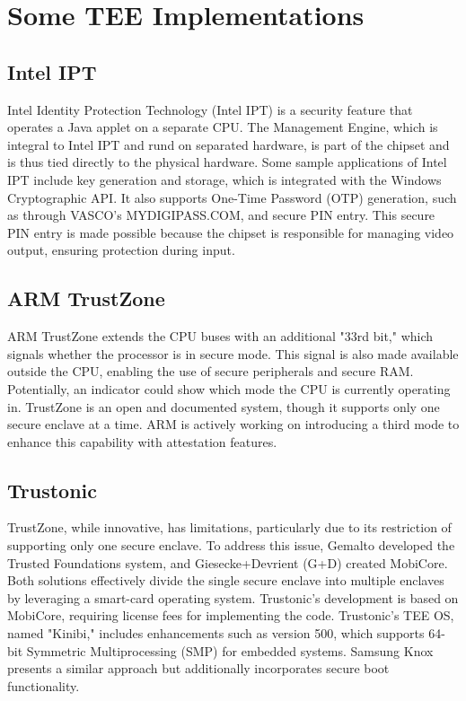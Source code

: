 \section{Some TEE Implementations}
\subsection{Intel IPT}

Intel Identity Protection Technology (Intel IPT) is a security feature
that operates a Java applet on a separate CPU. The Management Engine,
which is integral to Intel IPT and rund on separated hardware, is part
of the chipset and is thus tied directly to the physical hardware.
Some sample applications of Intel IPT include key generation and
storage, which is integrated with the Windows Cryptographic API. It
also supports One-Time Password (OTP) generation, such as through
VASCO's MYDIGIPASS.COM, and secure PIN entry. This secure PIN entry is
made possible because the chipset is responsible for managing video
output, ensuring protection during input.

\subsection{ARM TrustZone}

ARM TrustZone extends the CPU buses with an additional "33rd bit,"
which signals whether the processor is in secure mode. This signal is
also made available outside the CPU, enabling the use of secure
peripherals and secure RAM. Potentially, an indicator could show which
mode the CPU is currently operating in. TrustZone is an open and
documented system, though it supports only one secure enclave at a
time. ARM is actively working on introducing a third mode to enhance
this capability with attestation features.

\subsection{Trustonic}

TrustZone, while innovative, has limitations, particularly 
due to its restriction of supporting only one secure enclave. 
To address this issue, Gemalto developed the Trusted Foundations 
system, and Giesecke+Devrient (G+D) created MobiCore. 
Both solutions effectively divide the single secure enclave into 
multiple enclaves by leveraging a smart-card operating system. 
Trustonic’s development is based on MobiCore, requiring 
license fees for implementing the code. Trustonic's TEE OS, 
named "Kinibi," includes enhancements such as version 500, 
which supports 64-bit Symmetric Multiprocessing (SMP) for 
embedded systems. Samsung Knox presents a similar approach 
but additionally incorporates secure boot functionality.

